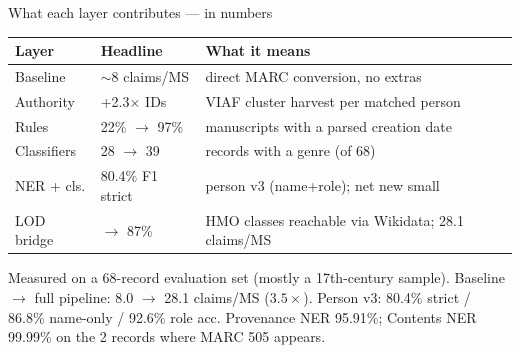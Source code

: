 \documentclass[aspectratio=169,12pt]{beamer}
\begin{document}
\begin{frame}[t]{What each layer contributes --- in numbers}
  \begin{tabular}{@{}p{}p{}p{}@{}}
    \toprule
    \textbf{Layer} & \textbf{Headline} & \textbf{What it means} \\
    \midrule
    Baseline & $\sim$8 claims/MS & direct MARC conversion, no extras \\
    Authority & +2.3$\times$ IDs & VIAF cluster harvest per matched person \\
    Rules & 22\% $\rightarrow$ 97\% & manuscripts with a parsed creation date \\
    Classifiers & 28 $\rightarrow$ 39 & records with a genre (of 68) \\
    NER + cls. & 80.4\% F1 strict & person v3 (name+role); net new small \\
    LOD bridge & $\rightarrow$ 87\% & HMO classes reachable via Wikidata; 28.1 claims/MS \\
    \bottomrule
  \end{tabular}
  \vfill
  {\footnotesize Measured on a 68-record evaluation set (mostly a 17th-century sample). Baseline $\rightarrow$ full pipeline: 8.0 $\rightarrow$ 28.1 claims/MS ($3.5\times$). Person v3: 80.4\% strict / 86.8\% name-only / 92.6\% role acc. Provenance NER 95.91\%; Contents NER 99.99\% on the 2 records where MARC 505 appears.}
\end{frame}
\end{document}
